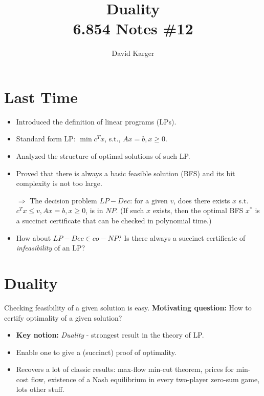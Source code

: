 \documentclass{article}
\title{Duality\\ 6.854 Notes \#12}
\author{David Karger}
\begin{document}
\section{Last Time}

\begin{itemize}
\item Introduced the definition of linear programs (LPs). 
\item Standard form LP: $\min c^Tx$, s.t., $Ax=b, x\geq 0$. 
\item Analyzed the structure of optimal solutions of such LP. 
\item Proved that there is always a basic feasible solution (BFS) and its bit complexity is not too large.

$\Rightarrow$ The decision problem $LP-Dec$: for a given $v$, does there exists $x$ s.t. $c^Tx\leq v, Ax=b, x\geq 0$, is in $NP$.
(If such $x$ exists, then the optimal BFS $x^*$ is a succinct certificate that can be checked in polynomial time.)
\item How about $LP-Dec\in co-NP$? Is there always a succinct certificate of {\em infeasibility} of an LP?
\end{itemize}

\section{Duality}

Checking feasibility of a given solution is easy.
\textbf{Motivating question:} How to certify optimality of a given solution?
\begin{itemize}
\item \textbf{Key notion:} {\em Duality} - strongest result in the theory of LP.
\item Enable one to give a (succinct) proof of optimality.
\item Recovers a lot of classic results: max-flow min-cut theorem, prices for min-cost flow, existence of a Nash equilibrium in every two-player zero-sum game,
  lots other stuff.
\end{itemize}
\end{document}
